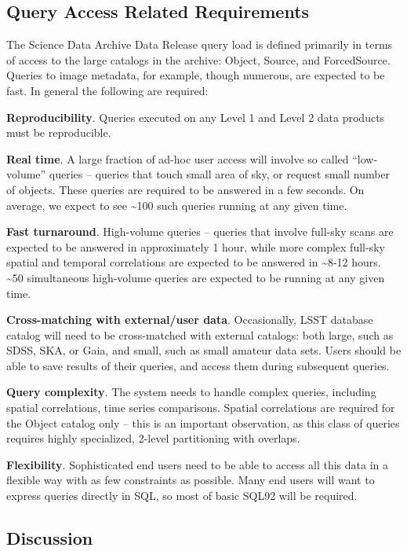 \documentclass[DM,toc]{lsstdoc}
\begin{document}
\subsection{Query Access Related Requirements}\label{query-access-related-requirements}

The Science Data Archive Data Release query load is defined primarily in
terms of access to the large catalogs in the archive: Object, Source,
and ForcedSource. Queries to image metadata, for example, though
numerous, are expected to be fast.  In general the following are required:

\textbf{Reproducibility}. Queries executed on any Level 1 and Level 2
data products must be reproducible.

\textbf{Real time}. A large fraction of ad-hoc user access will involve
so called ``low-volume'' queries -- queries that touch small area of
sky, or request small number of objects. These queries are required to
be answered in a few seconds. On average, we expect to see
\textasciitilde{}100 such queries running at any given time.

\textbf{Fast turnaround}. High-volume queries -- queries that involve full-sky
scans are expected to be answered in approximately 1 hour, while more complex
full-sky spatial and temporal correlations are expected to be answered in
\textasciitilde{}8-12 hours. \textasciitilde{}50 simultaneous high-volume
queries are expected to be running at any given time.

\textbf{Cross-matching with external/user data}. Occasionally, LSST
database catalog will need to be cross-matched with external catalogs:
both large, such as SDSS, SKA, or Gaia, and small, such as small amateur
data sets. Users should be able to save results of their queries, and
access them during subsequent queries.

\textbf{Query complexity}. The system needs to handle complex queries,
including spatial correlations, time series comparisons. Spatial
correlations are required for the Object catalog only -- this is an
important observation, as this class of queries requires highly
specialized, 2-level partitioning with overlaps.

\textbf{Flexibility}. Sophisticated end users need to be able to access
all this data in a flexible way with as few constraints as possible.
Many end users will want to express queries directly in SQL, so most of
basic SQL92 will be required.

\subsection{Discussion}\label{discussion}
\end{document}
